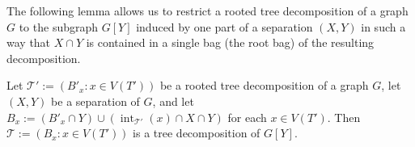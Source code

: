 \documentclass{patmorin}
\DeclareMathOperator{\interior}{int}
\DeclareMathOperator{\boundary}{\partial}
\begin{document}

The following lemma allows us to restrict a rooted tree decomposition of a graph $G$ to the subgraph $G[Y]$ induced by one part of a separation $(X,Y)$ in such a way that $X\cap Y$ is contained in a single bag (the root bag) of the resulting decomposition.

\begin{lem}\label{restricted_decomp}
    Let $\mathcal{T}':=(B'_x:x\in V(T'))$ be a rooted tree decomposition of a graph $G$, let $(X,Y)$ be a separation of $G$, and let $B_x:=(B'_x\cap Y)\cup (\interior_{\mathcal{T}'}(x) \cap X \cap Y)$ for each $x\in V(T')$.  Then $\mathcal{T}:=(B_x:x\in V(T'))$ is a tree decomposition of $G[Y]$.
\end{lem}
\end{document}
